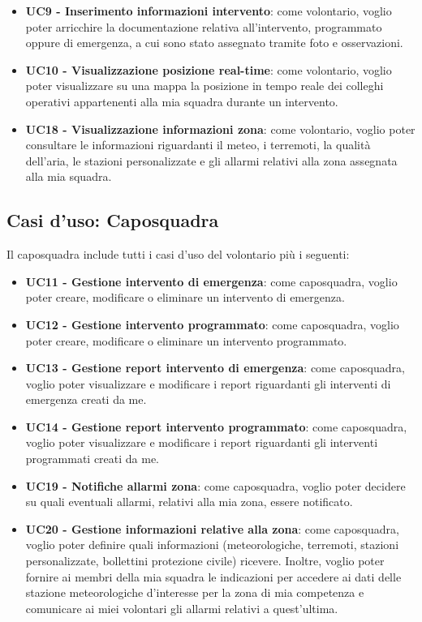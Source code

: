 \begin{itemize}
	\item \textbf{UC9 - Inserimento informazioni intervento}:
	come volontario, voglio poter arricchire la documentazione relativa all'intervento, programmato oppure di emergenza, a cui sono stato assegnato tramite foto e osservazioni.
	
	\item \textbf{UC10 - Visualizzazione posizione real-time}:
	come volontario, voglio poter visualizzare su una mappa la posizione in tempo reale dei colleghi operativi appartenenti alla mia squadra durante un intervento.
	
	\item \textbf{UC18 - Visualizzazione informazioni zona}:
	come volontario, voglio poter consultare le informazioni riguardanti il meteo, i terremoti, la qualità dell'aria, le stazioni personalizzate e gli allarmi relativi alla zona assegnata alla mia squadra.
\end{itemize}




\subsection{Casi d'uso: Caposquadra}
Il caposquadra include tutti i casi d'uso del volontario più i seguenti:
\begin{itemize}
	\item \textbf{UC11 - Gestione intervento di emergenza}:
	come caposquadra, voglio poter creare, modificare o eliminare un intervento di emergenza.
	
	\item \textbf{UC12 - Gestione intervento programmato}:
	come caposquadra, voglio poter creare, modificare o eliminare un intervento programmato.
	
	\item \textbf{UC13 - Gestione report intervento di emergenza}:
	come caposquadra, voglio poter visualizzare e modificare i report riguardanti gli interventi di emergenza creati da me.
	
	\item \textbf{UC14 - Gestione report intervento programmato}:
	come caposquadra, voglio poter visualizzare e modificare i report riguardanti gli interventi programmati creati da me.
		
	\item \textbf{UC19 - Notifiche allarmi zona}:
	come caposquadra, voglio poter decidere su quali eventuali allarmi, relativi alla mia zona, essere notificato.
	
	\item \textbf{UC20 - Gestione informazioni relative alla zona}:
	come caposquadra, voglio poter definire quali informazioni (meteorologiche, terremoti, stazioni personalizzate, bollettini protezione civile) ricevere. Inoltre, voglio poter fornire ai membri della mia squadra le indicazioni per accedere ai dati delle stazione meteorologiche d'interesse per la zona di mia competenza e comunicare ai miei volontari gli allarmi relativi a quest'ultima.
\end{itemize}

